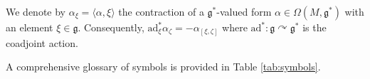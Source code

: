 \documentclass[10pt,a4paper]{amsart}
\numberwithin{equation}{section}
\newcommand{\g}{\mathfrak{g}}
\newcommand{\ad}{\mathrm{ad}}
\begin{document}
We denote by $\alpha_\xi=\langle\alpha,\xi\rangle$ the contraction of a $\g^*$-valued form $\alpha\in\Omega(M,\g^*)$ with an element $\xi\in\g$. Consequently, $\ad_\xi^*\alpha_\zeta = -\alpha_{[\xi,\zeta]}$ where $\ad^*\colon \g\curvearrowright\g^*$ is the coadjoint action.

A comprehensive glossary of symbols is provided in Table \ref{tab:symbols}.

\end{document}
